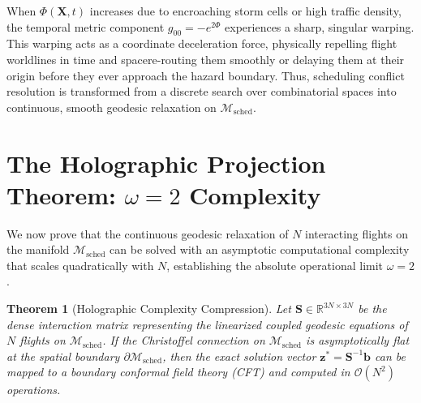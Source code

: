 \documentclass[11pt,a4paper]{book}
\newtheorem{theorem}{Theorem}
\begin{document}
When $\Phi(\mathbf{X}, t)$ increases due to encroaching storm cells or high traffic density, the temporal metric component $g_{00} = -e^{2\Phi}$ experiences a sharp, singular warping. This warping acts as a coordinate deceleration force, physically repelling flight worldlines in time and spacere-routing them smoothly or delaying them at their origin before they ever approach the hazard boundary. Thus, scheduling conflict resolution is transformed from a discrete search over combinatorial spaces into continuous, smooth geodesic relaxation on $\mathcal{M}_{\text{sched}}$.

\section{The Holographic Projection Theorem: $\omega = 2$ Complexity}\label{sec:holographic_projection}

We now prove that the continuous geodesic relaxation of $N$ interacting flights on the manifold $\mathcal{M}_{\text{sched}}$ can be solved with an asymptotic computational complexity that scales quadratically with $N$, establishing the absolute operational limit $\omega=2$.

\begin{theorem}[Holographic Complexity Compression]
Let $\mathbf{S} \in \mathbb{R}^{3N \times 3N}$ be the dense interaction matrix representing the linearized coupled geodesic equations of $N$ flights on $\mathcal{M}_{\text{sched}}$. If the Christoffel connection on $\mathcal{M}_{\text{sched}}$ is asymptotically flat at the spatial boundary $\partial \mathcal{M}_{\text{sched}}$, then the exact solution vector $\mathbf{z}^* = \mathbf{S}^{-1} \mathbf{b}$ can be mapped to a boundary conformal field theory (CFT) and computed in $\mathcal{O}(N^2)$ operations.
\end{theorem}
\end{document}
